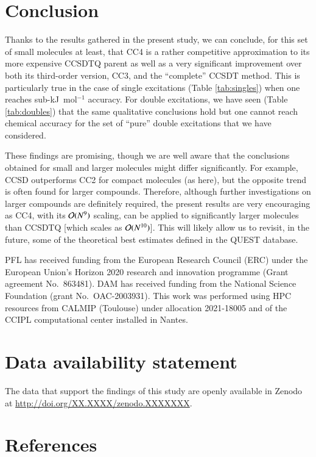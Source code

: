 \documentclass[aip,jcp,reprint,noshowkeys,superscriptaddress]{revtex4-1}
\begin{document}
\section{Conclusion}

Thanks to the results gathered in the present study, we can conclude, for this set of small molecules at least, that CC4 is a rather competitive approximation to its more expensive CCSDTQ parent as well as a very significant improvement over both its third-order version, CC3, and the ``complete'' CCSDT method.
This is particularly true in the case of single excitations (Table \ref{tab:singles}) when one reaches sub-kJ~mol$^{-1}$ accuracy.
For double excitations, we have seen (Table \ref{tab:doubles}) that the same qualitative conclusions hold but one cannot reach chemical accuracy for the set of ``pure'' double excitations that we have considered.

These findings are promising, though we are well aware that the conclusions obtained for small and larger molecules might differ significantly.
For example, CCSD outperforms CC2 for compact molecules (as here), but the opposite trend is often found for larger compounds.\cite{Loos_2018a,Loos_2020a,Veril_2021} 
Therefore, although further investigations on larger compounds are definitely required, the present results are very encouraging as CC4, with its $\order*{N^9}$ scaling, can be applied to significantly larger molecules than CCSDTQ [which scales as $\order*{N^{10}}$]. 
This will likely allow us to revisit, in the future, some of the theoretical best estimates defined in the QUEST database.\cite{Loos_2020a,Veril_2021}

\begin{acknowledgements}
PFL has received funding from the European Research Council (ERC) under the European Union's Horizon 2020 research and innovation programme (Grant agreement No.~863481).
DAM has received funding from the National Science Foundation (grant No.~OAC-2003931).
This work was performed using HPC resources from CALMIP (Toulouse) under allocation 2021-18005 and of the CCIPL computational center installed in Nantes.
\end{acknowledgements}

\section*{Data availability statement}
The data that support the findings of this study are openly available in Zenodo at \href{http://doi.org/XX.XXXX/zenodo.XXXXXXX}{http://doi.org/XX.XXXX/zenodo.XXXXXXX}.

\section*{References}

\end{document}
